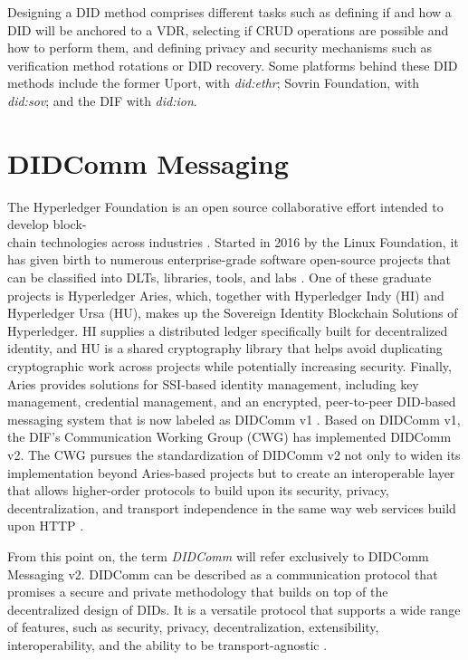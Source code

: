 Designing a DID method comprises different tasks such as defining if and how a DID will be anchored to a VDR, selecting if CRUD operations are possible and how to perform them, and defining privacy and security mechanisms such as verification method rotations or DID recovery. Some platforms behind these DID methods include the former Uport, with \emph{did:ethr}; Sovrin Foundation, with \emph{did:sov}; and the DIF with \emph{did:ion}.

\section{DIDComm Messaging}\label{section:didcomm}

The Hyperledger Foundation is an open source collaborative effort intended to develop block-\\chain technologies across industries \cite{jones_boswell_2022}. Started in 2016 by the Linux Foundation, it has given birth to numerous enterprise-grade software open-source projects that can be classified into DLTs, libraries, tools, and labs \cite{lusard_lehors_muscara_boswell_zsigri_2021}. One of these graduate projects is Hyperledger Aries, which, together with Hyperledger Indy (HI) and Hyperledger Ursa (HU), makes up the Sovereign Identity Blockchain Solutions of Hyperledger. HI supplies a distributed ledger specifically built for decentralized identity, and  HU is a shared cryptography library that helps avoid duplicating cryptographic work across projects while potentially increasing security. Finally, Aries provides solutions for SSI-based identity management, including key management, credential management, and an encrypted, peer-to-peer DID-based messaging system that is now labeled as DIDComm v1 \cite{jones_boswell_2022}. 
Based on DIDComm v1, the DIF's Communication Working Group (CWG) has implemented DIDComm v2. The CWG pursues the standardization of DIDComm v2 not only to widen its implementation beyond Aries-based projects but to create an interoperable layer that allows higher-order protocols to build upon its security, privacy, decentralization, and transport independence in the same way web services build upon HTTP \cite{young_2020} \cite{curren_looker_terbu_2020}.

From this point on, the term \emph{DIDComm} will refer exclusively to DIDComm Messaging v2. DIDComm can be described as a communication protocol that promises a secure and private methodology that builds on top of the decentralized design of DIDs. It is a versatile protocol that supports a wide range of features, such as security, privacy, decentralization, extensibility, interoperability, and the ability to be transport-agnostic \cite{curren_looker_terbu_2020}.

